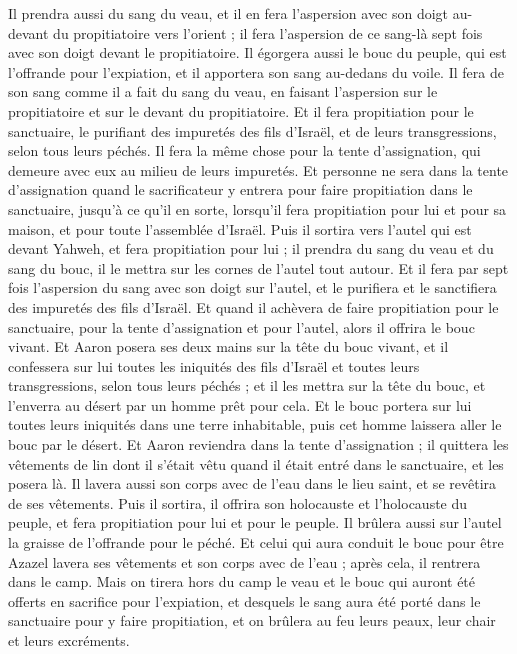 \begin{multicols}{2}
Il prendra aussi du sang du veau, et il en fera l'aspersion avec son doigt au-devant du propitiatoire vers l'orient ; il fera l'aspersion de ce sang-là sept fois avec son doigt devant le propitiatoire.
Il égorgera aussi le bouc du peuple, qui est l'offrande pour l'expiation, et il apportera son sang au-dedans du voile. Il fera de son sang comme il a fait du sang du veau, en faisant l'aspersion sur le propitiatoire et sur le devant du propitiatoire.
Et il fera propitiation pour le sanctuaire, le purifiant des impuretés des fils d'Israël, et de leurs transgressions, selon tous leurs péchés. Il fera la même chose pour la tente d'assignation, qui demeure avec eux au milieu de leurs impuretés.
Et personne ne sera dans la tente d'assignation quand le sacrificateur y entrera pour faire propitiation dans le sanctuaire, jusqu'à ce qu'il en sorte, lorsqu'il fera propitiation pour lui et pour sa maison, et pour toute l'assemblée d'Israël.
Puis il sortira vers l'autel qui est devant Yahweh, et fera propitiation pour lui ; il prendra du sang du veau et du sang du bouc, il le mettra sur les cornes de l'autel tout autour.
Et il fera par sept fois l'aspersion du sang avec son doigt sur l'autel, et le purifiera et le sanctifiera des impuretés des fils d'Israël.
Et quand il achèvera de faire propitiation pour le sanctuaire, pour la tente d'assignation et pour l'autel, alors il offrira le bouc vivant.
Et Aaron posera ses deux mains sur la tête du bouc vivant, et il confessera sur lui toutes les iniquités des fils d'Israël et toutes leurs transgressions, selon tous leurs péchés ; et il les mettra sur la tête du bouc, et l'enverra au désert par un homme prêt pour cela.
Et le bouc portera sur lui toutes leurs iniquités dans une terre inhabitable, puis cet homme laissera aller le bouc par le désert.
Et Aaron reviendra dans la tente d'assignation ; il quittera les vêtements de lin dont il s'était vêtu quand il était entré dans le sanctuaire, et les posera là.
Il lavera aussi son corps avec de l'eau dans le lieu saint, et se revêtira de ses vêtements. Puis il sortira, il offrira son holocauste et l'holocauste du peuple, et fera propitiation pour lui et pour le peuple.
Il brûlera aussi sur l'autel la graisse de l'offrande pour le péché.
Et celui qui aura conduit le bouc pour être Azazel lavera ses vêtements et son corps avec de l'eau ; après cela, il rentrera dans le camp.
Mais on tirera hors du camp le veau et le bouc qui auront été offerts en sacrifice pour l'expiation, et desquels le sang aura été porté dans le sanctuaire pour y faire propitiation, et on brûlera au feu leurs peaux, leur chair et leurs excréments.

\end{multicols}
